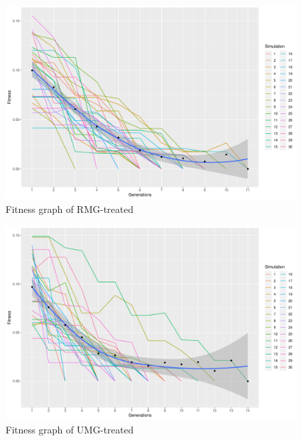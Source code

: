 \documentclass{strrespaper-trad}
\begin{document}
		\begin{figure}[htbp]
			\centering
			\includegraphics[width=\textwidth]{../figures/rmg_ftrack}
			\caption{Fitness graph of RMG-treated}
			\label{fig:fitgraph_rmg}
		\end{figure}
		\begin{figure}[htbp]
			\centering
			\includegraphics[width=\textwidth]{../figures/umg_ftrack}
			\caption{Fitness graph of UMG-treated}
			\label{fig:fitgraph_umg}
		\end{figure}
\end{document}
